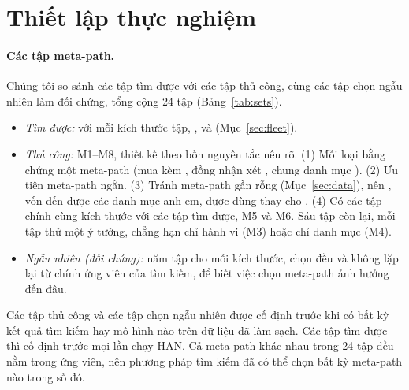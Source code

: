 \section{Thiết lập thực nghiệm}
\label{sec:setup}

\paragraph{Các tập meta-path.} Chúng tôi so sánh các tập tìm được với các tập thủ công, cùng các
tập chọn ngẫu nhiên làm đối chứng, tổng cộng 24 tập (Bảng~\ref{tab:sets}).
\begin{itemize}
  \item \emph{Tìm được:} với mỗi kích thước tập, ,  và 
        (Mục~\ref{sec:fleet}).
  \item \emph{Thủ công:} M1--M8, thiết kế theo bốn nguyên tắc nêu rõ.
        (1) Mỗi loại bằng chứng một meta-path (mua kèm , đồng nhận xét , chung
        danh mục ). (2) Ưu tiên meta-path ngắn. (3) Tránh meta-path gần rỗng (Mục~\ref{sec:data}), nên
        , vốn đến được các danh mục anh em, được dùng thay cho . (4) Có các tập chính cùng kích thước
        với các tập tìm được, M5 và M6. Sáu tập còn lại, mỗi tập thử một ý tưởng, chẳng hạn chỉ hành vi (M3) hoặc chỉ
        danh mục (M4).
  \item \emph{Ngẫu nhiên (đối chứng):} năm tập cho mỗi kích thước, chọn đều và không lặp lại từ
        chính  ứng viên của tìm kiếm, để biết việc chọn meta-path ảnh hưởng đến
        đâu.
\end{itemize}
Các tập thủ công và các tập chọn ngẫu nhiên được cố định trước khi có bất kỳ kết quả tìm kiếm hay
mô hình nào trên dữ liệu đã làm sạch. Các tập tìm được thì cố định trước mọi lần chạy HAN. Cả
 meta-path khác nhau trong 24 tập đều nằm trong  ứng
viên, nên phương pháp tìm kiếm đã có thể chọn bất kỳ meta-path nào trong số đó.




